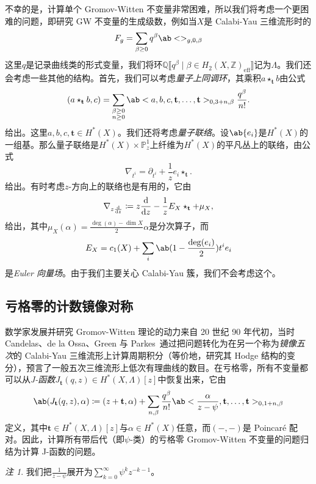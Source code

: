\documentclass{amsart}
\theoremstyle{definition}
\theoremstyle{remark}
\newtheorem{rmk}[thm]{注}
\theoremstyle{plain}
\theoremstyle{definition}
\theoremstyle{remark}
\newcommand{\Z}{\mathbb{Z}}
\newcommand{\Q}{\mathbb{Q}}
\renewcommand{\P}{\mathbb{P}}
\newcommand{\mbf}[1]{\mathbf{#1}}
\newcommand{\mr}[1]{\mathrm{#1}}
\newcommand{\1}{\mathbf{1}}
\newcommand{\2}{\mathbf{2}}
\newcommand{\3}{\mathbf{3}}
\newcommand{\ps}[1]{\llbracket #1 \rrbracket}
\begin{document}
不幸的是，计算单个 Gromov-Witten 不变量非常困难，所以我们将考虑一个更困难的问题，即研究 GW 不变量的生成级数，例如当\(X\)是 Calabi-Yau 三维流形时的
\[ F_g = \sum_{\beta \geq 0} q^{\beta} \ab<>_{g,0,\beta} \]
这里\(q\)是记录曲线类的形式变量，我们将环\(\Q\ps{q^{\beta} \mid \beta \in H_2(X, \Z)_{\mr{eff}}}\)记为\(\Lambda\)。我们还会考虑一些其他的结构。首先，我们可以考虑\textit{量子上同调环}，其乘积\(a \star_{\mbf{t}} b\)由公式
\[
    (a \star_{\mbf{t}} b, c) = \sum_{\substack{\beta \geq 0 \\ n \geq 0}} \ab<a,b,c, \mbf{t}, \ldots, \mbf{t}>_{0,3+n,\beta} \frac{q^{\beta}}{n!}.
\]
给出。这里\(a,b,c, \mbf{t} \in H^*(X)\)。我们还将考虑\textit{量子联络}。设\(\ab\{ e_i \}\)是\(H^*(X)\)的一组基。那么量子联络是\(H^*(X) \times \P^1_z\)上纤维为\(H^*(X)\)的平凡丛上的联络，由公式
\[ \nabla_{t^i} = \partial_{t^i} + \frac{1}{z} e_i \star_{\mbf{t}}. \]
给出。有时考虑\(z\)-方向上的联络也是有用的，它由
\[ \nabla_{z \odv{}{z}} \coloneqq z \odv{}{z} - \frac{1}{z} E_X \star_{\mbf{t}} + \mu_X, \]
给出，其中\(\mu_X(\alpha) = \frac{\deg(\alpha) - \dim X}{2} \alpha\)是分次算子，而
\[ E_X = c_1(X) + \sum_i \ab(1 - \frac{\deg(e_i)}{2})t^i e_i \]
是\textit{Euler 向量场}。由于我们主要关心 Calabi-Yau 簇，我们不会考虑这个。

\subsection{亏格零的计数镜像对称}%
\label{sub:Enumerative mirror symmetry in genus zero}

数学家发展并研究 Gromov-Witten 理论的动力来自 20 世纪 90 年代初，当时 Candelas、de la Ossa、Green 与 Parkes~\cite{CandelasEtAl1991}通过把问题转化为在另一个称为\textit{镜像五次}的 Calabi-Yau 三维流形上计算周期积分（等价地，研究其 Hodge 结构的变分），预言了一般五次三维流形上低次有理曲线的数目。在亏格零，所有不变量都可以从\textit{J-函数}\(J_{\mbf{t}}(q,z) \in H^*(X, \Lambda)[z]\)中恢复出来，它由
\[ \ab( J_{\mbf{t}}(q, z), \alpha ) \coloneqq (z + \mbf{t}, \alpha) + \sum_{n, \beta} \frac{q^{\beta}}{n!} \ab< \frac{\alpha}{z-\psi}, \mbf{t}, \ldots, \mbf{t}>_{0,1+n, \beta} \]
定义，其中\(\mbf{t} \in H^*(X, \Lambda)[z]\)与\(\alpha \in H^*(X)\)任意，而\((-,-)\)是 Poincar\'e 配对。因此，计算所有带后代（即\(\psi\)-类）的亏格零 Gromov-Witten 不变量的问题归结为计算 J-函数的问题。

\begin{rmk}
    我们把\(\frac{1}{z-\psi}\)展开为\(\sum_{k=0}^{\infty} \psi^k z^{-k-1}\)。
\end{rmk}
\end{document}
